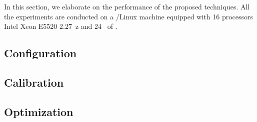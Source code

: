 In this section, we elaborate on the performance of the proposed techniques.
All the experiments are conducted on a /Linux machine equipped with 16 processors Intel Xeon E5520 2.27~z and 24~ of .

\subsection{Configuration} 


\subsection{Calibration} 


\subsection{Optimization} 

